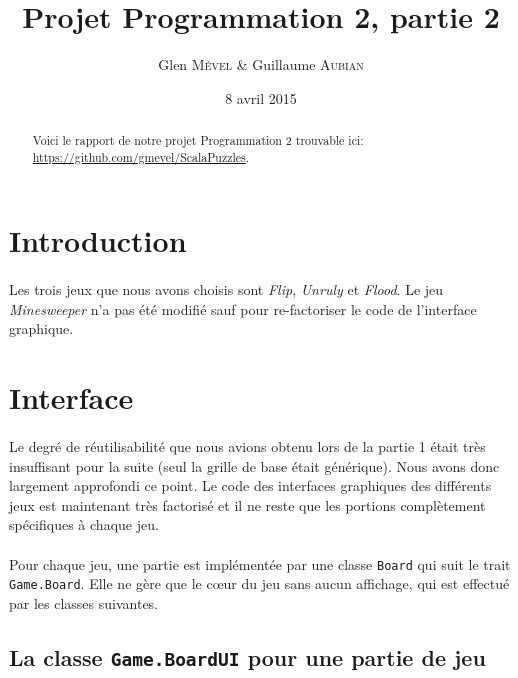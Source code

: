\documentclass[a4paper]{article}
\title{Projet Programmation 2, partie 2}
\author{Glen \textsc{Mével} \& Guillaume \textsc{Aubian}}
\date{8 avril 2015}
\newcommand\ttt\texttt
\begin{document}
\maketitle

	\begin{abstract}
	Voici le rapport de notre projet Programmation 2 trouvable ici:
	\url{https://github.com/gmevel/ScalaPuzzles}.
	\end{abstract}

\section*{Introduction}

	\paragraph{}
	Les trois jeux que nous avons choisis sont \textsl{Flip}, \textsl{Unruly} et
	\textsl{Flood}. Le jeu \textsl{Minesweeper} n'a pas été modifié sauf pour
	re-factoriser le code de l’interface graphique.

	\section{Interface}

	\paragraph{}
	Le degré de réutilisabilité que nous avions obtenu lors de la partie 1 était
	très insuffisant pour la suite (seul la grille de base était générique).
	Nous avons donc largement approfondi ce point. Le code des interfaces
	graphiques des différents jeux est maintenant très factorisé et il ne reste
	que les portions complètement spécifiques à chaque jeu.

	\paragraph{}
	Pour chaque jeu, une partie est implémentée par une classe \ttt{Board} qui
	suit le trait \ttt{Game.Board}. Elle ne gère que le cœur du jeu sans aucun
	affichage, qui est effectué par les classes suivantes.

	\subsection{La classe \ttt{Game.BoardUI} pour une partie de jeu}
\end{document}
